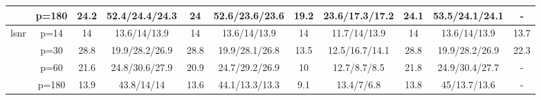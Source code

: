 \begin{table}[ht]
{\begin{tabular}{|c|c|cc|cc|cc|cc|c|}
   & p=180 & 24.2 & 52.4/24.4/24.3 & 24 & 52.6/23.6/23.6 & 19.2 & 23.6/17.3/17.2 & 24.1 & 53.5/24.1/24.1 & - \\ 
  \midrule\multirow{4}[2]{*}{lsnr} & p=14 & 14 & 13.6/14/13.9 & 14 & 13.6/14/13.9 & 14 & 11.7/14/13.9 & 14 & 13.6/14/13.9 & 13.7 \\ 
   & p=30 & 28.8 & 19.9/28.2/26.9 & 28.8 & 19.9/28.1/26.8 & 13.5 & 12.5/16.7/14.1 & 28.8 & 19.9/28.2/26.9 & 22.3 \\ 
   & p=60 & 21.6 & 24.8/30.6/27.9 & 20.9 & 24.7/29.2/26.9 & 10 & 12.7/8.7/8.5 & 21.8 & 24.9/30.4/27.7 & - \\ 
   & p=180 & 13.9 & 43.8/14/14 & 13.6 & 44.1/13.3/13.3 & 9.1 & 13.4/7/6.8 & 13.8 & 45/13.7/13.6 & - \\ 
   \bottomrule 
\end{tabular}
}
\end{table}
